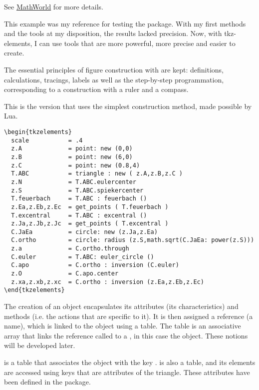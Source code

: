 See \href{https://mathworld.wolfram.com/ApolloniusCircle.html}{MathWorld} for more details.

This example was my reference for testing the  package. With my first methods and the tools at my disposition, the results lacked precision. Now, with tkz-elements, I can use tools that are more powerful, more precise and easier to create.

The essential principles of figure construction with  are kept: definitions, calculations, tracings, labels as well as the  step-by-step programmation, corresponding to a construction with a ruler and a compass.

This is the version that uses the simplest construction method, made possible by Lua.

\begin{mybox}
\begin{verbatim}
\begin{tkzelements}
  scale           = .4
  z.A             = point: new (0,0)
  z.B             = point: new (6,0)
  z.C             = point: new (0.8,4)
  T.ABC           = triangle : new ( z.A,z.B,z.C )
  z.N             = T.ABC.eulercenter
  z.S             = T.ABC.spiekercenter
  T.feuerbach     = T.ABC : feuerbach ()
  z.Ea,z.Eb,z.Ec  = get_points ( T.feuerbach )
  T.excentral     = T.ABC : excentral ()
  z.Ja,z.Jb,z.Jc  = get_points ( T.excentral )
  C.JaEa          = circle: new (z.Ja,z.Ea)
  C.ortho         = circle: radius (z.S,math.sqrt(C.JaEa: power(z.S)))
  z.a             = C.ortho.through
  C.euler         = T.ABC: euler_circle ()
  C.apo           = C.ortho : inversion (C.euler)
  z.O             = C.apo.center
  z.xa,z.xb,z.xc  = C.ortho : inversion (z.Ea,z.Eb,z.Ec)
\end{tkzelements}
\end{verbatim}
\end{mybox}

The creation of an object encapsulates its attributes (its characteristics) and methods (i.e. the actions that are specific to it). It is then assigned a reference (a name), which is linked to the object using a table. The table is an associative array that links the reference called  to a , in this case the object. These notions will be developed later.

 is a table that associates the object  with the key .  is also a table, and its elements are accessed using keys that are attributes of the triangle. These attributes have been defined in the package.

